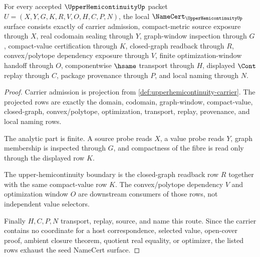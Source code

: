\begin{theorem}
\label{thm:upperhemicontinuity-namecert-obligations}
For every accepted $\UpperHemicontinuityUp$ packet $U=(X,Y,G,K,R,V,O,H,C,P,N)$, the local $\NameCert_{\UpperHemicontinuityUp}$ surface consists exactly of carrier admission, compact-metric source exposure through $X$, real codomain sealing through $Y$, graph-window inspection through $G$, compact-value certification through $K$, closed-graph readback through $R$, convex/polytope dependency exposure through $V$, finite optimization-window handoff through $O$, componentwise $\hsame$ transport through $H$, displayed $\Cont$ replay through $C$, package provenance through $P$, and local naming through $N$.
\end{theorem}
\begin{proof}
Carrier admission is projection from \autoref{def:upperhemicontinuity-carrier}. The projected rows are exactly the domain, codomain, graph-window, compact-value, closed-graph, convex/polytope, optimization, transport, replay, provenance, and local naming rows.

The analytic part is finite. A source probe reads $X$, a value probe reads $Y$, graph membership is inspected through $G$, and compactness of the fibre is read only through the displayed row $K$.

The upper-hemicontinuity boundary is the closed-graph readback row $R$ together with the same compact-value row $K$. The convex/polytope dependency $V$ and optimization window $O$ are downstream consumers of those rows, not independent value selectors.

Finally $H,C,P,N$ transport, replay, source, and name this route. Since the carrier contains no coordinate for a host correspondence, selected value, open-cover proof, ambient closure theorem, quotient real equality, or optimizer, the listed rows exhaust the seed NameCert surface.
\end{proof}

